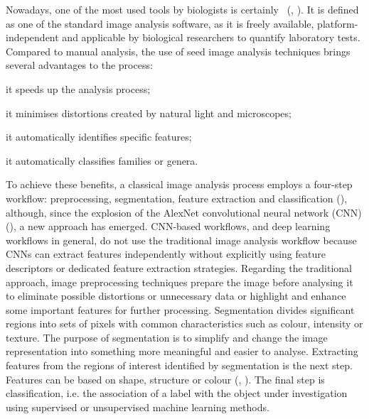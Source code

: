 \documentclass[twocolumn]{svjour3}           %
\begin{document}
%
Nowadays, one of the most used tools by biologists is certainly~\cite{ImageJ} (\cite{Landini}, \cite{Lind2012}). It is defined as one of the standard image analysis software, as it is freely available, platform-independent and applicable by biological researchers to quantify laboratory tests.
%
Compared to manual analysis, the use of seed image analysis techniques brings several advantages to the process:
\begin{enumerate*}
    \item it speeds up the analysis process;
    \item it minimises distortions created by natural light and microscopes;
    \item it automatically identifies specific features;
    \item it automatically classifies families or genera.
\end{enumerate*}

To achieve these benefits, a classical image analysis process employs a four-step workflow: preprocessing, segmentation, feature extraction and classification (\cite{Gonz2018}), although, since the explosion of the AlexNet convolutional neural network (CNN) (\cite{Krizhevsky2012}), a new approach has emerged. CNN-based workflows, and deep learning workflows in general, do not use the traditional image analysis workflow because CNNs can extract features independently without explicitly using feature descriptors or dedicated feature extraction strategies. Regarding the traditional approach, image preprocessing techniques prepare the image before analysing it to eliminate possible distortions or unnecessary data or highlight and enhance some important features for further processing. Segmentation divides significant regions into sets of pixels with common characteristics such as colour, intensity or texture. The purpose of segmentation is to simplify and change the image representation into something more meaningful and easier to analyse. Extracting features from the regions of interest identified by segmentation is the next step. Features can be based on shape, structure or colour (\cite{Dirub2015}, \cite{Dirub_2009}). The final step is classification, i.e. the association of a label with the object under investigation using supervised or unsupervised machine learning methods. 
\end{document}
